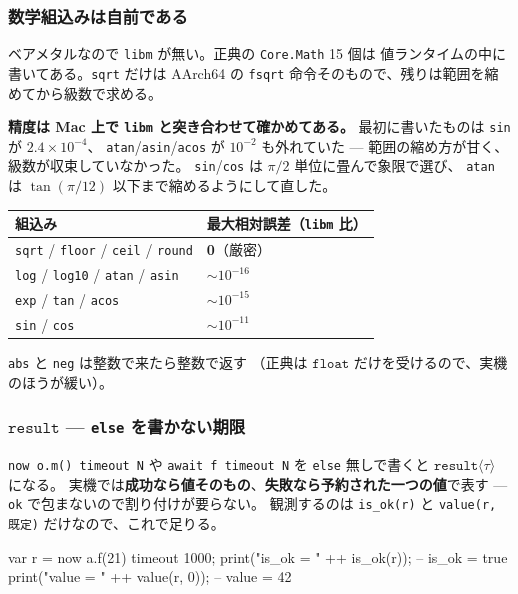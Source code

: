 \documentclass[11pt,a4paper]{ltjsarticle}
\newcommand{\ty}[1]{\ensuremath{\mathtt{#1}}}
\begin{document}
\subsubsection*{数学組込みは自前である}
\label{sec:hw-math}

ベアメタルなので \texttt{libm} が無い。正典の \texttt{Core.Math} 15 個は
値ランタイムの中に書いてある。\texttt{sqrt} だけは AArch64 の \texttt{fsqrt}
命令そのもので、残りは範囲を縮めてから級数で求める。

\textbf{精度は Mac 上で \texttt{libm} と突き合わせて確かめてある。}
最初に書いたものは \texttt{sin} が $2.4\times10^{-4}$、
\texttt{atan}/\texttt{asin}/\texttt{acos} が $10^{-2}$ も外れていた ---
範囲の縮め方が甘く、級数が収束していなかった。
\texttt{sin}/\texttt{cos} は $\pi/2$ 単位に畳んで象限で選び、
\texttt{atan} は $\tan(\pi/12)$ 以下まで縮めるようにして直した。

\begin{center}
\small
\begin{tabular}{@{}ll@{}}
\toprule
組込み & 最大相対誤差（\texttt{libm} 比） \\
\midrule
\texttt{sqrt} / \texttt{floor} / \texttt{ceil} / \texttt{round} & \textbf{0}（厳密） \\
\texttt{log} / \texttt{log10} / \texttt{atan} / \texttt{asin} & $\sim 10^{-16}$ \\
\texttt{exp} / \texttt{tan} / \texttt{acos} & $\sim 10^{-15}$ \\
\texttt{sin} / \texttt{cos} & $\sim 10^{-11}$ \\
\bottomrule
\end{tabular}
\end{center}

\texttt{abs} と \texttt{neg} は整数で来たら整数で返す
（正典は \ty{float} だけを受けるので、実機のほうが緩い）。

\subsubsection*{\ty{result} --- \texttt{else} を書かない期限}

\texttt{now o.m() timeout N} や \texttt{await f timeout N} を
\texttt{else} 無しで書くと \ty{result}$\langle\tau\rangle$ になる。
実機では\textbf{成功なら値そのもの}、\textbf{失敗なら予約された一つの値}で表す ---
\texttt{ok} で包まないので割り付けが要らない。
観測するのは \texttt{is\_ok(r)} と \texttt{value(r, 既定)} だけなので、これで足りる。

\begin{term}
var r = now a.f(21) timeout 1000;
print("is_ok = " ++ is_ok(r));      -- is_ok = true
print("value = " ++ value(r, 0));   -- value = 42
\end{term}
\end{document}
